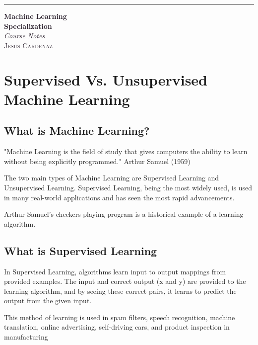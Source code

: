 \documentclass[a4paper]{article}
\begin{document}
    \begin{titlepage}
        \raggedleft
        \rule{1pt}{\textheight}
        \hspace{0.05\textwidth}
        \parbox[b]{0.75\textwidth}{
            {\Huge\bfseries \textcolor[HTML]{2A202C}{Machine Learning}\\[0.5\baselineskip] \textcolor[HTML]{2A202C}{Specialization}}\\[2\baselineskip]
            {\large\textit{\textcolor[HTML]{2A202C}{Course Notes}}}\\[4\baselineskip]
            {\Large\textsc{\textcolor[HTML]{2A202C}{Jesus Cardenaz}}}
            
            \vspace{0.5\textheight}
        }
    \end{titlepage}

    \setlength{\parindent}{0pt}
    \setlength{\parskip}{5pt}


    \section{Supervised Vs. Unsupervised Machine Learning}
    \subsection*{What is Machine Learning?}
    "Machine Learning is the field of study that gives computers the ability to learn without being explicitly programmed." Arthur Samuel (1959)

    The two main types of Machine Learning are Supervised Learning and Unsupervised Learning. Supervised Learning, being the most widely used, is used in many real-world applications and has seen the most rapid advancements.

    Arthur Samuel's checkers playing program is a historical example of a learning algorithm.

    \subsection*{What is Supervised Learning}
    In Supervised Learning, algorithms learn input to output mappings from provided examples. The input and correct output (x and y) are provided to the learning algorithm, and by seeing these correct pairs, it learns to predict the output from the given input.

    This method of learning is used in spam filters, speech recognition, machine translation, online advertising, self-driving cars, and product inspection in manufacturing
\end{document}
